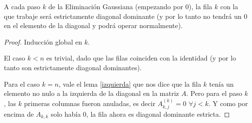 \begin{proposition}\label{pivoteo}
 A cada paso $k$ de la Eliminación Gaussiana (empezando por 0), la fila $k$ con la que trabaje será estrictamente diagonal dominante (y por lo tanto no tendrá un 0 en el elemento de la diagonal y podrá operar normalmente).
\end{proposition}
\begin{proof}
 Inducción global en $k$.
 
 El caso $k < n$ es trivial, dado que las filas coinciden con la identidad (y por lo tanto son estrictamente diagonal dominantes).
 
 Para el caso $k = n$, vale el lema \ref{izquierda} que nos dice que la fila $k$ tenía un elemento no nulo a la izquierda de la diagonal en la matriz $A$. Pero para el paso $k$, las $k$ primeras columnas fueron anuladas, es decir $A_{k,j}^{(k)}=0$ $\forall j < k$. Y como por encima de $A_{k,k}$ solo había 0, la fila ahora es diagonal dominante estricta.
 
\end{proof}